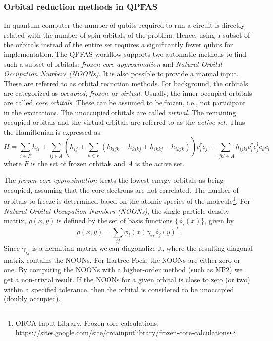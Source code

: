 \documentclass[journal,onecolumn]{IEEEtran}
\begin{document}
\subsubsection{Orbital reduction methods in QPFAS}
\label{sec:orbital_reduction_methods_in_qpfas}
In quantum computer the number of qubits required to run a circuit is directly related with the number of spin orbitals of the problem. Hence, using a subset of the orbitals instead of the entire set requires a significantly fewer qubits for implementation. 
The QPFAS workflow supports two automatic methods to find such a subset of orbitals: \textit{frozen core approximation} and \textit{Natural Orbital Occupation Numbers (NOONs)}.
It is also possible to provide a manual input. 
These are referred to as orbital reduction methods.
%
For background, the orbitals are categorized as \textit{occupied}, \textit{frozen}, or \textit{virtual}. 
Usually, the inner occupied orbitals are called \textit{core orbitals}. 
These can be assumed to be frozen, i.e., not participant in the excitations. 
The unoccupied orbitals are called \textit{virtual}. 
The remaining occupied orbitals and the virtual orbitals are referred to as the \textit{active set}. 
Thus the Hamiltonian is expressed as
\begin{equation}\label{eqn:hamiltonian}
H = \sum_{i\in F}h_{ii}  + \sum_{ij \in A} \left( h_{ij}  + \sum_{k \in F} (h_{kijk} - h_{kikj}+h_{ikkj}-h_{ikjk})  \right) c_i^\dagger c_j
+ \sum_{ijkl \in A}h_{ijkl} c_i^\dagger c_j^\dagger c_k c_l 
\end{equation}
where $F$ is the set of frozen orbitals and $A$ is the active set.

The \textit{frozen core approximation} treats the lowest energy orbitals as being occupied, assuming that the core electrons are not correlated. 
The number of orbitals to freeze is determined based on the atomic species of the molecule\footnote{ORCA Input Library, Frozen core calculations. \url{https://sites.google.com/site/orcainputlibrary/frozen-core-calculations}}.   
%
For \textit{Natural Orbital Occupation Numbers (NOONs)}, the single particle density matrix, $\rho(x, y)$ is defined by the set of basis functions $\{\phi_i(x)\}$, given by
\begin{equation}\label{eqn:density}
     \rho(x, y) = \sum_{ij} \phi_i(x) \gamma_{ij} \phi_j(y)^*.
\end{equation}    
Since $\gamma_{ij}$ is a hermitian matrix we can diagonalize it, where the resulting diagonal matrix contains the NOONs. 
For Hartree-Fock, the NOONs are either zero or one. 
By computing the NOONs with a higher-order method (such as MP2) we get a non-trivial result. 
If the NOONs for a given orbital is close to zero (or two) within a specified tolerance, then the orbital is considered to be unoccupied (doubly occupied).
\end{document}
